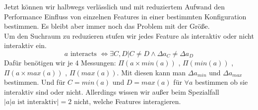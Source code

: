 \documentclass{article}
\begin{document}
	Jetzt können wir halbwegs verlässlich und mit reduziertem Aufwand den Performance Einfluss von einzelnen Features in einer bestimmten Konfiguration bestimmen. Es bleibt aber immer noch das Problem mit der Größe.\\
	Um den Suchraum zu reduzieren stufen wir jedes Feature als interaktiv oder nicht interaktiv ein. 
		\begin{equation*}
		 a \text{ interacts } \Leftrightarrow \exists C,D | C \neq D \land \Delta a_C \neq \Delta a_D
		\end{equation*}
	Dafür benötigen wir je 4 Messungen: $\Pi(a \times min(a))$ , $\Pi(min(a))$ , $\Pi(a \times max(a))$ , $\Pi(max(a))$. Mit diesen kann man $\Delta a_{min}$ und $\Delta a_{max}$ bestimmen.
	Und für $C=min(a)$ und $D = max(a)$ für $\forall a$ bestimmen ob sie interaktiv sind oder nicht.
	Allerdings wissen wir außer beim Spezialfall $|{a| a \text{ ist interaktiv}}|=2$ nicht, welche Features interagieren.  
	 
	
	
	\nocite{*}
	
	
\end{document}
